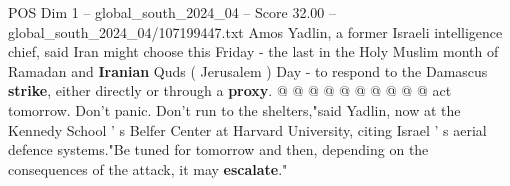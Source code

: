 \begin{textsample}{POS Dim 1 – global\_south\_2024\_04 – Score 32.00 – global\_south\_2024\_04/107199447.txt}
Amos Yadlin, a former Israeli intelligence chief, said Iran might choose this Friday - the last in the Holy Muslim month of Ramadan and \textbf{Iranian} Quds ( Jerusalem ) Day - to respond to the Damascus \textbf{strike}, either directly or through a \textbf{proxy}. @ @ @ @ @ @ @ @ @ @ act tomorrow.
Don't panic.
Don't run to the shelters,"said Yadlin, now at the Kennedy School ' s Belfer Center at Harvard University, citing Israel ' s aerial defence systems."Be tuned for tomorrow and then, depending on the consequences of the attack, it may \textbf{escalate}."

\end{textsample}
